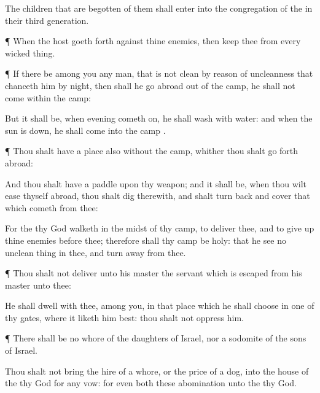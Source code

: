 {The
children that are
begotten of them shall
enter into the
congregation of the
{} in their
third
generation.


\par }{\PP {}¶ When the
host goeth
forth against thine
enemies, then
keep thee from every
wicked
thing.


\par }{\PP {}¶ If there be among you any
man, that is not
clean by reason of uncleanness that
chanceth him by
night, then shall he
go
abroad out of the
camp, he shall not
come
within the
camp:

But it shall be, when
evening cometh
on, he shall
wash
{} with
water: and when the
sun is
down, he shall
come
into the
camp
{}.


\par }{\PP {}¶ Thou shalt have a place
also
without the
camp, whither thou shalt go
forth
abroad:

And thou shalt have a
paddle upon thy
weapon; and it shall be, when thou wilt
ease thyself
abroad, thou shalt
dig therewith, and shalt turn
back and
cover that which
cometh from thee:

For the
{} thy
God
walketh in the
midst of thy
camp, to
deliver thee, and to give
up thine
enemies
before thee; therefore shall thy
camp be
holy: that he
see no
unclean
thing in thee, and turn
away from
thee.


\par }{\PP {}¶ Thou shalt not
deliver unto his
master the
servant which is
escaped from his
master unto thee:

He shall
dwell with thee,
{}
among you, in that
place which he shall
choose in
one of thy
gates, where it liketh him
best: thou shalt not
oppress him.


\par }{\PP {}¶ There shall be no
whore of the
daughters of
Israel, nor a
sodomite of the
sons of
Israel.

Thou shalt not
bring the
hire of a
whore, or the
price of a
dog, into the
house of the
{} thy
God for any
vow: for even
both these
{}
abomination unto the
{} thy
God.


}
